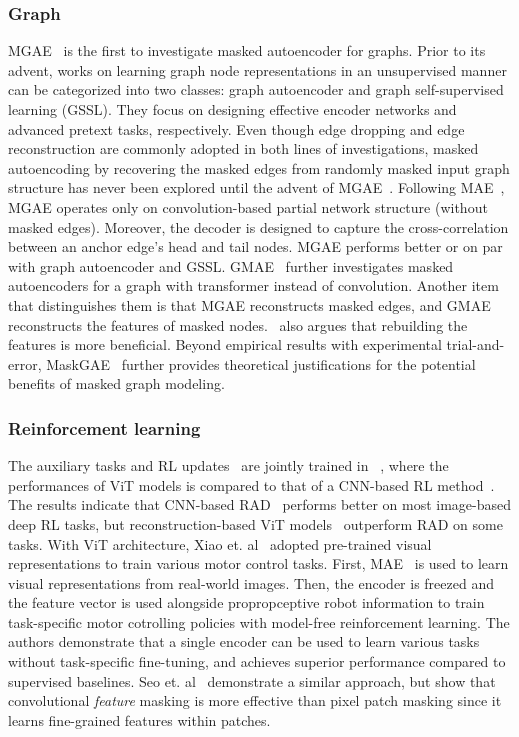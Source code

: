 \documentclass[10pt,journal,compsoc]{IEEEtran}
\begin{document}
\subsubsection{Graph}
MGAE~\cite{tan2022mgae} is the first to investigate masked autoencoder for graphs. Prior to its advent, works on learning graph node representations in an unsupervised manner can be categorized into two classes: graph autoencoder and graph self-supervised learning (GSSL). They focus on designing effective encoder networks and advanced pretext tasks, respectively. Even though edge dropping and edge reconstruction are commonly adopted in both lines of investigations, masked autoencoding by recovering the masked edges from randomly masked input graph structure has never been explored until the advent of MGAE~\cite{tan2022mgae}. Following MAE~\cite{he2022masked}, MGAE operates only on convolution-based partial network structure (without masked edges). Moreover, the decoder is designed to capture the cross-correlation between an anchor edge's head and tail nodes. MGAE performs better or on par with graph autoencoder and GSSL. GMAE~\cite{chen2022graph} further investigates masked autoencoders for a graph with transformer instead of convolution. Another item that distinguishes them is that MGAE reconstructs masked edges, and GMAE reconstructs the features of masked nodes.~\cite{hou2022graphmae} also argues that rebuilding the features is more beneficial. Beyond empirical results with experimental trial-and-error, MaskGAE~\cite{li2022maskgae} further provides theoretical
justifications for the potential benefits of masked graph modeling. 


\subsubsection{Reinforcement learning}
The auxiliary tasks and RL updates~\cite{haarnoja2018soft} are jointly trained in ~\cite{tao2022evaluating}, where the performances of ViT models is compared to that of a CNN-based RL method~\cite{laskin2020reinforcement}. The results indicate that CNN-based RAD~\cite{laskin2020reinforcement} performs better on most image-based deep RL tasks, but reconstruction-based ViT models~\cite{baevski2022data2vec,he2022masked} outperform RAD on some tasks. With ViT architecture, Xiao et. al~\cite{xiao2022masked} adopted pre-trained visual representations to train various motor control tasks. First, MAE~\cite{he2022masked} is used to learn visual representations from real-world images. Then, the encoder is freezed and the feature vector is used alongside propropceptive robot information to train task-specific motor cotrolling policies with model-free reinforcement learning\cite{schulman2017proximal}. The authors demonstrate that a single encoder can be used to learn various tasks without task-specific fine-tuning, and achieves superior performance compared to supervised baselines. Seo et. al~\cite{seo2022masked} demonstrate a similar approach, but show that convolutional \textit{feature} masking is more effective than pixel patch masking since it learns fine-grained features within patches. 
\end{document}
